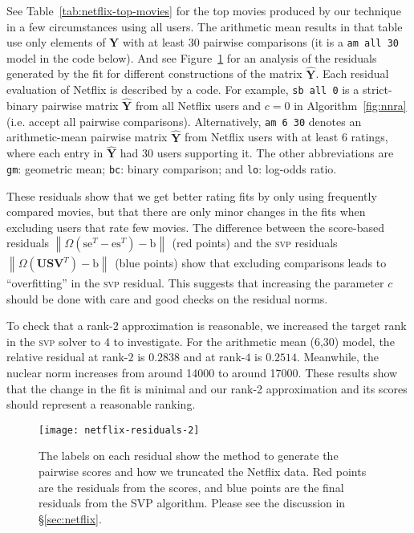 \documentclass{sig-alternate}
\newcommand{\algo}[1]{\textsc{\lowercase{#1}}}
\newcommand{\mat}{\boldsymbol}
\renewcommand{\vec}[1]{\boldsymbol{\mathrm{#1}}}
\providecommand{\mYhat}{\ensuremath{\mat{\hat{\mY}}}}
\providecommand{\mS}{\ensuremath{\mat{S}}}
\providecommand{\mU}{\ensuremath{\mat{U}}}
\providecommand{\mV}{\ensuremath{\mat{V}}}
\providecommand{\mY}{\ensuremath{\mat{Y}}}
\providecommand{\vb}{\ensuremath{\vec{b}}}
\providecommand{\ve}{\ensuremath{\vec{e}}}
\providecommand{\vs}{\ensuremath{\vec{s}}}
\newcommand{\sstretchsym}[3]{\ensuremath{\left#1 #3 \right#2}}
\newcommand{\normof}[2][]{\sstretchsym{\|}{\|}{#2}_{#1}}
\begin{document}
See Table~\ref{tab:netflix-top-movies}
for the top movies produced by our technique in a few circumstances
using all users.  The arithmetic mean results in that table
use only elements of $\mY$ with at least $30$ pairwise comparisons
(it is a \texttt{am all 30} model in the code below).
And see Figure~\ref{fig:netflix-residuals} for an analysis
of the residuals generated by the fit for different constructions
of the matrix $\mYhat$.  
Each residual evaluation of Netflix is described by a code.
For example, \texttt{sb all 0} is a strict-binary pairwise
matrix $\mYhat$ from all Netflix users and $c=0$ in Algorithm~\ref{fig:nnra}
(i.e. accept all pairwise comparisons).  Alternatively,
\texttt{am 6 30} denotes an arithmetic-mean pairwise matrix $\mYhat$
from Netflix users with at least 6 ratings, where each entry in $\mYhat$
had 30 users supporting it.  The other abbreviations are
\texttt{gm}: geometric mean; \texttt{bc}: binary comparison; and
\texttt{lo}: log-odds ratio.

These residuals show that we get better rating
fits by only using frequently compared movies, but that there 
are only minor changes in the fits when excluding users that
rate few movies.  The difference between
the score-based residuals $\normof{\Omega(\vs \ve^T - \ve
\vs^T)-\vb}$ (red points) and the \algo{svp} residuals 
$\normof{\Omega(\mU \mS \mV^T)-\vb}$ (blue points) show that 
excluding comparisons leads to ``overfitting'' 
in the \algo{svp} residual.  This suggests that increasing
the parameter $c$ should be done with care and good
checks on the residual norms.

\enlargethispage{\baselineskip}
To check that a rank-$2$ approximation is reasonable,
we increased the target rank in the \algo{svp} solver
to $4$ to investigate.  For the arithmetic mean (6,30) 
model, the relative residual at rank-$2$ is $0.2838$ and
at rank-$4$ is $0.2514$.  Meanwhile, the nuclear
norm increases from around 14000 to around 17000.
These results show that the change in the fit is minimal
and our rank-2 approximation and its scores
should represent a reasonable ranking.

 \begin{figure}[t]
  \centering
  \texttt{[image: netflix-residuals-2]}
  \caption{The labels on each residual show the method to generate
   the pairwise scores and how we truncated the Netflix data. 
	 Red points are the residuals from the scores, and blue 
	 points are the final residuals from the SVP algorithm.
	 Please see the discussion in \S\ref{sec:netflix}.} 
   \label{fig:netflix-residuals}
	 \vspace{-\baselineskip}
 \end{figure}
\end{document}
